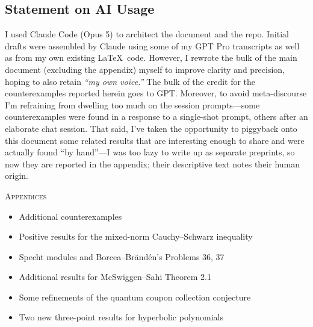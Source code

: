 \documentclass[11pt]{amsart}
\numberwithin{equation}{section}   %
\begin{document}
\subsection*{Statement on AI Usage}
I used Claude Code (Opus 5) to architect the document and the repo. Initial drafts were assembled by Claude using some of my GPT Pro transcripts as well as from my own existing \LaTeX\ code. However, I rewrote the bulk of the main document (excluding the appendix) myself to improve clarity and precision, hoping to also retain \emph{``my own voice.''} The bulk of the credit for the counterexamples reported herein goes to GPT. Moreover, to avoid meta-discourse I'm refraining from dwelling too much on the session prompts---some counterexamples were found in a response to a single-shot prompt, others after an elaborate chat session. That said, I've taken the opportunity to piggyback onto this document some related results that are interesting enough to share and were actually found ``by hand''---I was too lazy to write up as separate preprints, so now they are reported in the appendix; their descriptive text notes their human origin.





\cxendrule
\par\addvspace{\baselineskip}
{\centering\scshape Appendices\par}
\begin{itemize}[label={},leftmargin=2.2em,itemsep=0.2em]
\item[\ref{sec:additional}.] Additional counterexamples \dotfill \pageref{sec:additional}
\item[\ref{sec:proofdetails}.] Positive results for the mixed-norm Cauchy--Schwarz inequality \dotfill \pageref{sec:proofdetails}
\item[\ref{sec:aim36pencil}.] Specht modules and Borcea--Br\"and\'en's Problems 36, 37 \dotfill \pageref{sec:aim36pencil}
\item[\ref{sec:macdonaldomega}.] Additional results for McSwiggen--Sahi Theorem 2.1 \dotfill \pageref{sec:macdonaldomega}
\item[\ref{sec:qcctrace}.] Some refinements of the quantum coupon collection conjecture \dotfill \pageref{sec:qcctrace}
\item[\ref{sec:lorentzianaudit}.] Two new three-point results for hyperbolic polynomials \dotfill \pageref{sec:lorentzianaudit}
\end{itemize}
\end{document}
